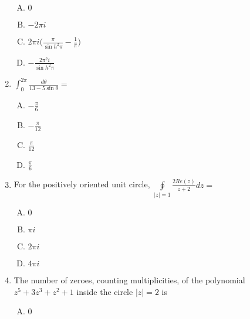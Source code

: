 \documentclass[12pt,a4paper]{article}
\begin{document}
\begin{enumerate}
\begin{enumerate}[(A)]

\item $
0
$

\item $
-2 \pi i
$

\item $
2 \pi i \Big(\frac{\pi}{\sin h^2 \pi} - \frac{1}{\pi}\Big)
$

\item $
- \frac{2 {\pi}^2 i}{\sin h^2 \pi}
$

\end{enumerate}

\item $\int_{0}^{2 \pi}\frac{d \theta}{13-5 \sin \theta}= $


\begin{enumerate}[(A)]

\item $
-\frac{\pi}{6}
$

\item $
-\frac{\pi}{12}
$

\item $
\frac{\pi}{12}
$

\item $
\frac{\pi}{6}
$

\end{enumerate}


\item For the positively oriented unit circle, $\oint\limits_{\mid z \mid = 1 } \frac{2 R e(z)}{z+2} dz= $
 
\begin{enumerate}[(A)]

\item $
0
$

\item $
\pi i
$

\item $
2 \pi i
$

\item $
4 \pi i
$

\end{enumerate}

\item The number of zeroes, counting multiplicities, of the polynomial $z^5+3z^3+z^2+1$ inside the circle $ \mid z \mid =2 $ is


\begin{enumerate}[(A)]

\item $
0
$


\end{enumerate}
\end{enumerate}
\end{document}
